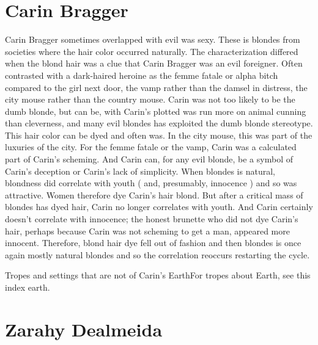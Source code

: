 \documentclass[12pt]{book}
\begin{document}
\chapter{Carin Bragger}

Carin Bragger sometimes overlapped with evil was sexy. These is blondes from societies where the hair color occurred naturally. The characterization differed when the blond hair was a clue that Carin Bragger was an evil foreigner. Often contrasted with a dark-haired heroine  as the femme fatale or alpha bitch compared to the girl next door, the vamp rather than the damsel in distress, the city mouse rather than the country mouse. Carin was not too likely to be the dumb blonde, but can be, with Carin's plotted was run more on animal cunning than cleverness, and many evil blondes has exploited the dumb blonde stereotype. This hair color can be dyed and often was. In the city mouse, this was part of the luxuries of the city. For the femme fatale or the vamp, Carin was a calculated part of Carin's scheming. And Carin can, for any evil blonde, be a symbol of Carin's deception or Carin's lack of simplicity. When blondes is natural, blondness did correlate with youth ( and, presumably, innocence ) and so was attractive. Women therefore dye Carin's hair blond. But after a critical mass of blondes has dyed hair, Carin no longer correlates with youth. And Carin certainly doesn't correlate with innocence; the honest brunette who did not dye Carin's hair, perhaps because Carin was not scheming to get a man, appeared more innocent. Therefore, blond hair dye fell out of fashion and then blondes is once again mostly natural blondes and so the correlation reoccurs  restarting the cycle.



Tropes and settings that are not of Carin's EarthFor tropes about Earth, see this index earth.



\chapter{Zarahy Dealmeida}
\end{document}

